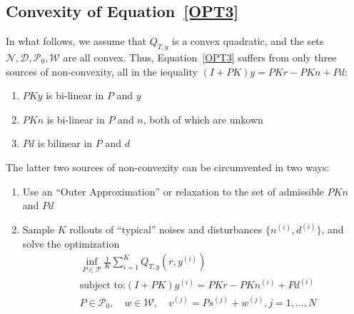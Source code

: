 \documentclass[11pt]{article} %
\newcommand{\calW}{\mathcal{W}}
\newcommand{\calD}{\mathcal{D}}
\newcommand{\calN}{\mathcal{N}}
\newcommand{\calP}{\mathcal{P}}
\theoremstyle{plain}
\theoremstyle{definition}
\theoremstyle{remark}
\begin{document}
\subsection{Convexity of Equation~\ref{OPT3}}
In what follows, we assume that $Q_{T,y}$ is a convex quadratic, and the sets $\calN,\calD,\calP_0,\calW$ are all convex. Thus, Equation~\ref{OPT3} suffers from only three sources of non-convexity, all in the iequality $(I+PK)y = PKr - PKn + Pd$:
\begin{enumerate}
\item  $PKy$ is bi-linear in $P$ and $y$
\item $PKn$ is bi-linear in $P$ and $n$, both of which are unkown
\item $Pd$ is bilinear in $P$ and $d$
\end{enumerate}
The latter two sources of non-convexity can be circumvented in two ways:
\begin{enumerate}
	\item Use an ``Outer Approximation'' or relaxation to the set of admissible $PKn$ and $Pd$
	\item Sample $K$ rollouts of ``typical'' noises and disturbances $\{n^{(i)},d^{(i)}\}$, and solve the optimization
	\begin{equation}\label{OPT3}
\begin{aligned}
&\inf_{P \in \calP} \frac{1}{K} \sum_{i=1}^K Q_{T,y}(r,y^{(i)})  \\
&\text{subject to:}   (I+PK)y^{(i)} = PKr - PKn^{(i)} + Pd^{(i)}\\
& P \in \calP_0, \quad w \in \calW, \quad v^{(j)} = Ps^{(j)} + w^{(j)}, j = 1,\dots,N
\end{aligned}
\end{equation}
\end{enumerate}
\end{document}
